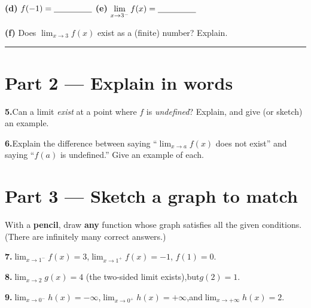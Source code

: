 \documentclass[12pt]{article}
\newcommand{\wl}{\par\vspace{5mm}\noindent\rule{\linewidth}{0.4pt}\par\vspace{1mm}}
\newcommand{\gridaxes}[1]{%
  \draw[step=1,gray!25,very thin] (-#1,-#1) grid (#1,#1);%
  \draw[thick,->] (-#1-0.4,0)--(#1+0.4,0) node[right]{$x$};%
  \draw[thick,->] (0,-#1-0.4)--(0,#1+0.4) node[above]{$y$};%
  \foreach \n in {-#1,...,#1}{\ifnum\n=0\else
      \draw (\n,0.08)--(\n,-0.08) node[below]{\scriptsize$\n$};
      \draw (0.08,\n)--(-0.08,\n) node[left]{\scriptsize$\n$};\fi}%
}
\begin{document}
\medskip
\textbf{(d)} $f(-1) = \underline{\hspace{1.6cm}}$\quad
\textbf{(e)} $\displaystyle\lim_{x \to 3^-} f(x) = \underline{\hspace{1.6cm}}$

\medskip
\textbf{(f)} Does $\displaystyle\lim_{x \to 3} f(x)$ exist as a (finite) number? Explain.
\wl

\newpage
\section*{Part 2 --- Explain in words}

\textbf{5.}\quad Can a limit \emph{exist} at a point where $f$ is \emph{undefined}? Explain, and give (or sketch)
an example.

\vspace{17em}

\textbf{6.}\quad Explain the difference between saying ``$\displaystyle\lim_{x \to a} f(x)$ does not exist'' and
saying ``$f(a)$ is undefined.'' Give an example of each.


\newpage
\section*{Part 3 --- Sketch a graph to match}
With a \textbf{pencil}, draw \textbf{any} function whose graph satisfies all the given conditions. (There are infinitely many correct answers.)

\bigskip
\textbf{7.}\quad $\displaystyle\lim_{x \to 1^-} f(x) = 3$,\quad $\displaystyle\lim_{x \to 1^+} f(x) = -1$,\quad
$f(1) = 0$.

\begin{center}
\end{center}

\textbf{8.}\quad $\displaystyle\lim_{x \to 2} g(x) = 4$ \;(the two-sided limit exists),\quad but\quad $g(2) = 1$.

\begin{center}
\end{center}

\newpage
\textbf{9.}\quad $\displaystyle\lim_{x \to 0^-} h(x) = -\infty$,\quad $\displaystyle\lim_{x \to 0^+} h(x) =
+\infty$,\quad and\quad $\displaystyle\lim_{x \to +\infty} h(x) = 2$.
\end{document}
